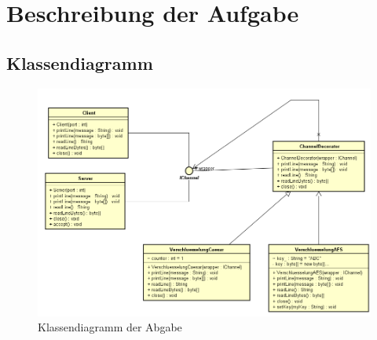 \clearpage
\section{Beschreibung der Aufgabe}
\subsection{Klassendiagramm}
	\begin{figure}[H]
	\centering
	\includegraphics[width=1\textwidth]{images/abgabe.png}
	\caption{Klassendiagramm der Abgabe} 
\end{figure}

